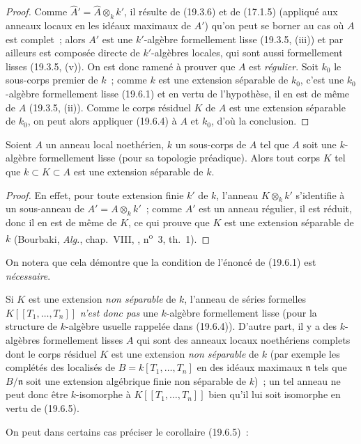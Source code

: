 \begin{proof}
Comme $\widehat A'=\widehat A\otimes_k k'$, il résulte de (19.3.6) et de
(17.1.5) (appliqué aux anneaux locaux en les idéaux maximaux de $A'$) qu'on
peut se borner au cas où $A$ est complet~; alors $A'$ est une $k'$-algèbre
formellement lisse (19.3.5, (iii)) et par ailleurs est composée directe de
$k'$-algèbres locales, qui sont aussi formellement lisses (19.3.5, (v)). On est
donc ramené à prouver que $A$ est \emph{régulier}. Soit $k_0$ le sous-corps
premier de $k$~; comme $k$ est une extension séparable de $k_0$, c'est une
$k_0$-algèbre formellement lisse (19.6.1) et en vertu de l'hypothèse, il en est
de même de $A$ (19.3.5, (ii)). Comme le corps résiduel $K$ de $A$ est une
extension séparable de $k_0$, on peut alors appliquer (19.6.4) à $A$ et $k_0$,
d'où la conclusion.
\end{proof}


\begin{corollary}[19.6.5.1]
\label{0.19.6.5.1-fr}
Soient $A$ un anneau local noethérien, $k$ un sous-corps de $A$ tel que $A$
soit une $k$-algèbre formellement lisse (pour sa topologie préadique). Alors
tout corps $K$ tel que $k\subset K\subset A$ est une extension séparable de
$k$.
\end{corollary}

\begin{proof}
En effet, pour toute extension finie $k'$ de $k$, l'anneau $K\otimes_k k'$ 
s'identifie à un sous-anneau de $A'=A\otimes_k k'$~; comme $A'$ est un anneau
régulier, il est réduit, donc il en est de même de $K$, ce qui prouve que $K$
est une extension séparable de $k$ (Bourbaki, \emph{Alg.}, chap.~VIII,
, n\textsuperscript{o}~3, th.~1).
\end{proof}

On notera que cela démontre que la condition de l'énoncé de (19.6.1) est
\emph{nécessaire}.

\begin{remark}[19.6.5.2]
\label{0.19.6.5.2-fr}
Si $K$ est une extension \emph{non séparable} de $k$, l'anneau de séries
formelles $K[[T_1,\ldots,T_n]]$ \emph{n'est donc pas} une $k$-algèbre
formellement lisse (pour la structure de $k$-algèbre usuelle rappelée dans
(19.6.4)). D'autre part, il y a des $k$-algèbres formellement lisses $A$ qui
sont des anneaux locaux noethériens complets dont le corps résiduel $K$ est une
extension \emph{non séparable} de $k$ (par exemple les complétés des localisés
de $B=k[T_1,\ldots,T_n]$ en des idéaux maximaux $\mathfrak n$ tels que
$B/\mathfrak n$ soit une extension algébrique finie non séparable de $k$)~; un
tel anneau ne peut donc être $k$-isomorphe à $K[[T_1,\ldots,T_n]]$ bien qu'il
lui soit isomorphe en vertu de (19.6.5).

On peut dans certains cas préciser le corollaire (19.6.5)~:
\end{remark}

